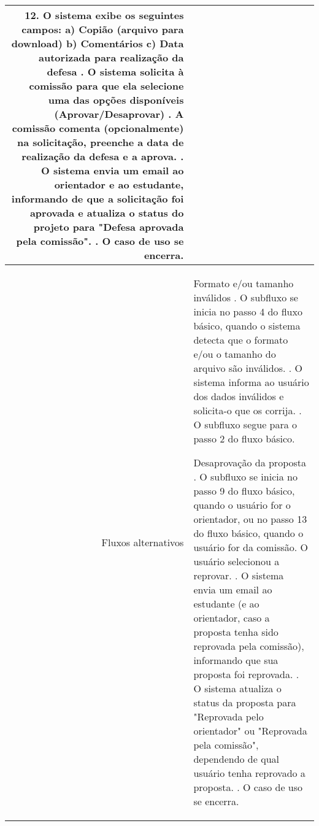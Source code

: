 \begin{longtable}{r p{12cm}}
                12. O sistema exibe os seguintes campos: \newline
                    \hspace*{1cm} a) Copião (arquivo para download) \newline 
                    \hspace*{1cm} b) Comentários \newline 
                    \hspace*{1cm} c) Data autorizada para realização da defesa \newline
                13. O sistema solicita à comissão para que ela selecione uma das opções disponíveis (Aprovar/Desaprovar) \newline
                14. A comissão comenta (opcionalmente) na solicitação, preenche a data de realização da defesa e a aprova. \newline
                15. O sistema envia um email ao orientador e ao estudante, informando de que a solicitação foi aprovada e atualiza o status do projeto para "Defesa aprovada pela comissão".    \newline
                16. O caso de uso se encerra. 
               \\ \hline
Fluxos alternativos & Formato e/ou tamanho inválidos \newline
                        1. O subfluxo se inicia no passo 4 do fluxo básico, quando o sistema detecta que o formato e/ou o tamanho do arquivo são inválidos. \newline
                        2. O sistema informa ao usuário dos dados inválidos e solicita-o que os corrija. \newline
                        3. O subfluxo segue para o passo 2 do fluxo básico. \newline
                    
                    Desaprovação da proposta \newline
                        1. O subfluxo se inicia no passo 9 do fluxo básico, quando o usuário for o orientador, ou no passo 13 do fluxo básico, quando o usuário for da comissão. O usuário selecionou a reprovar. \newline
                        2. O sistema envia um email ao estudante (e ao orientador, caso a proposta tenha sido reprovada pela comissão), informando que sua proposta foi reprovada. \newline
                        3. O sistema atualiza o status da proposta para "Reprovada pelo orientador" ou "Reprovada pela comissão", dependendo de qual usuário tenha reprovado a proposta. \newline
                        4. O caso de uso se encerra. 
                    \\ \hline        
\end{longtable}





